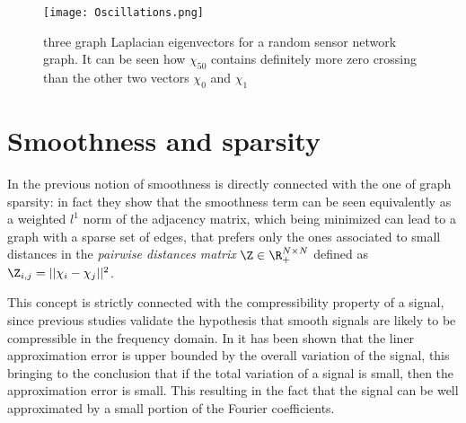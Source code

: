 \begin{figure}
\centering
\texttt{[image: Oscillations.png]}
\caption{three graph Laplacian eigenvectors for a random sensor network graph. It can be seen how $\chi_{50}$ contains definitely more zero crossing than the other two vectors $\chi_0$ and $\chi_1$}
\label{fig:osc}
\end{figure}

\section{Smoothness and sparsity}
In \cite{Kalofolias2016} the previous notion of smoothness is directly connected with the one of graph sparsity: in fact they show that the smoothness term can be seen equivalently as a weighted $l^1$ norm of the adjacency matrix, which being minimized can lead to a graph with a sparse set of edges, that prefers only the ones associated to small distances in the \textit{pairwise distances matrix} $\Z \in \R^{N\times N}_+$ defined as $\Z_{i,j} = ||\chi_i - \chi_j||^2$.

This concept is strictly connected with the compressibility property of a signal, since previous studies validate the hypothesis that smooth signals are likely to be compressible in the frequency domain. In \cite{Zhu2012} it has been shown that the liner approximation error is upper bounded by the overall variation of the signal, this bringing to the conclusion that if the total variation of a signal is small, then the approximation error is small. This resulting in the fact that the signal can be well approximated by a small portion of the Fourier coefficients.

